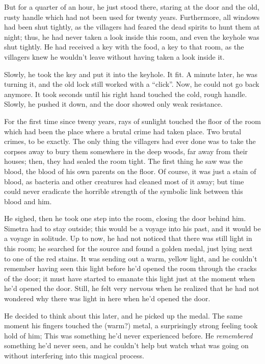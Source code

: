 But for a quarter of an hour, he just stood there, staring at the door and the old, rusty handle which had not been used for twenty years. Furthermore, all windows had been shut tightly, as the villagers had feared the dead spirits to hunt them at night; thus, he had never taken a look inside this room, and even the keyhole was shut tightly. He had received a key with the food, a key to that room, as the villagers knew he wouldn't leave without having taken a look inside it.

Slowly, he took the key and put it into the keyhole. It fit.
A minute later, he was turning it, and the old lock still worked with a \enquote{click}. Now, he could not go back anymore. 
It took seconds until his right hand touched the cold, rough handle. Slowly, he pushed it down, and the door showed only weak resistance. 

For the first time since tweny years, rays of sunlight touched the floor of the room which had been the place where a brutal crime had taken place. Two brutal crimes, to be exactly. The only thing the villagers had ever done was to take the corpses away to bury them somewhere in the deep woods, far away from their houses; then, they had sealed the room tight. 
The first thing he saw was the blood, the blood of his own parents on the floor. Of course, it was just a stain of blood, as bacteria and other creatures had cleaned most of it away; but time could never eradicate the horrible strength of the symbolic link between this blood and him.

He sighed, then he took one step into the room, closing the door behind him. Simetra had to stay outside; this would be a voyage into his past, and it would be a voyage in solitude. 
Up to now, he had not noticed that there was still light in this room; he searched for the source and found a golden medal, just lying next to one of the red stains. It was sending out a warm, yellow light, and he couldn't remember having seen this light before he'd opened the room through the cracks of the door; it must have started to emanate this light just at the moment when he'd opened the door. Still, he felt very nervous when he realized that he had not wondered why there was light in here when he'd opened the door.

He decided to think about this later, and he picked up the medal. The same moment his fingers touched the (warm?) metal, a surprisingly strong feeling took hold of him; This was something he'd never experienced before. He \emph{remembered} something he'd never seen, and he couldn't help but watch what was going on without interfering into this magical process.

